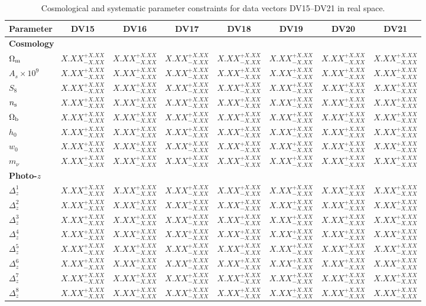 \documentclass[%
reprint,
superscriptaddress,
 amsmath,amssymb,
 aps,
]{revtex4-2}
\newcommand{\dvres}{$X.XX^{+X.XX}_{-X.XX}$}
\begin{document}
\begin{table}[htbp]
\centering
\caption{Cosmological and systematic parameter constraints
for data vectors DV15--DV21 in real space.}
\label{tab:results_c}
\footnotesize
\setlength{\tabcolsep}{8pt}
\renewcommand{\arraystretch}{1.15}

\begin{tabular}{l*{7}{c}}
\hline\hline
Parameter & DV15 & DV16 & DV17 & DV18 & DV19 & DV20 & DV21 \\
\hline

\multicolumn{8}{l}{\textbf{Cosmology}} \\
\hline
$\Omega_{\rm m}$ & \dvres & \dvres & \dvres & \dvres & \dvres & \dvres & \dvres \\
$A_s\times 10^9$ & \dvres & \dvres & \dvres & \dvres & \dvres & \dvres & \dvres \\
$S_8$ & \dvres & \dvres & \dvres & \dvres & \dvres & \dvres & \dvres \\
$n_{\rm s}$ & \dvres & \dvres & \dvres & \dvres & \dvres & \dvres & \dvres \\
$\Omega_{\rm b}$ & \dvres & \dvres & \dvres & \dvres & \dvres & \dvres & \dvres \\
$h_0$ & \dvres & \dvres & \dvres & \dvres & \dvres & \dvres & \dvres \\
$w_0$ & \dvres & \dvres & \dvres & \dvres & \dvres & \dvres & \dvres \\
$m_\nu$ & \dvres & \dvres & \dvres & \dvres & \dvres & \dvres & \dvres \\

\hline
\multicolumn{8}{l}{\textbf{Photo-$z$}} \\
\hline
$\Delta_z^1$ & \dvres & \dvres & \dvres & \dvres & \dvres & \dvres & \dvres \\
$\Delta_z^2$ & \dvres & \dvres & \dvres & \dvres & \dvres & \dvres & \dvres \\
$\Delta_z^3$ & \dvres & \dvres & \dvres & \dvres & \dvres & \dvres & \dvres \\
$\Delta_z^4$ & \dvres & \dvres & \dvres & \dvres & \dvres & \dvres & \dvres \\
$\Delta_z^5$ & \dvres & \dvres & \dvres & \dvres & \dvres & \dvres & \dvres \\
$\Delta_z^6$ & \dvres & \dvres & \dvres & \dvres & \dvres & \dvres & \dvres \\
$\Delta_z^7$ & \dvres & \dvres & \dvres & \dvres & \dvres & \dvres & \dvres \\
$\Delta_z^8$ & \dvres & \dvres & \dvres & \dvres & \dvres & \dvres & \dvres \\


\end{tabular}
\end{table}
\end{document}

